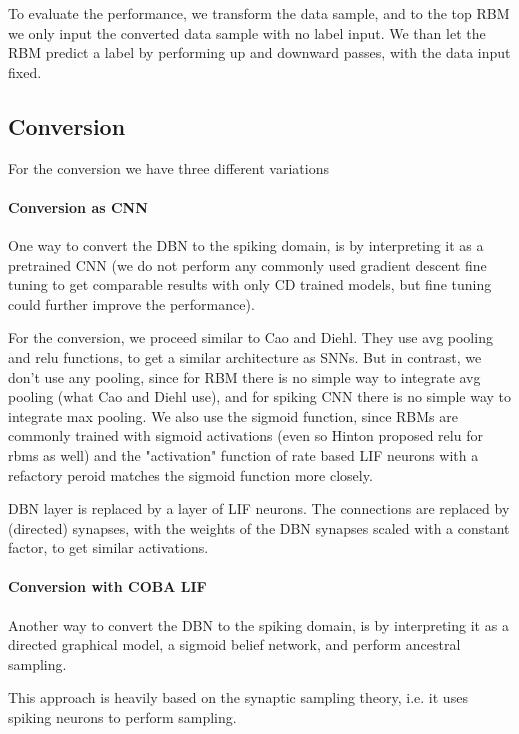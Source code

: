 To evaluate the performance, we transform the data sample, and to the top RBM we only input the converted data sample with no label input.
We than let the RBM predict a label by performing up and downward passes, with the data input fixed.


\subsection{Conversion}

For the conversion we have three different variations

\paragraph{Conversion as CNN} 

One way to convert the DBN to the spiking domain, is by interpreting it as a pretrained CNN (we do not perform any commonly used gradient descent fine tuning to get comparable results with only CD trained models, but fine tuning could further improve the performance).

For the conversion, we proceed similar to Cao and Diehl.
They use avg pooling and relu functions, to get a similar architecture as SNNs.
But in contrast, we don't use any pooling, since for RBM there is no simple way to integrate avg pooling (what Cao and Diehl use), and for spiking CNN there is no simple way to integrate max pooling.
We also use the sigmoid function, since RBMs are commonly trained with sigmoid activations (even so Hinton proposed relu for rbms as well) and the "activation" function of rate based LIF neurons with a refactory peroid matches the sigmoid function more closely.

DBN layer is replaced by a layer of LIF neurons. 
The connections are replaced by (directed) synapses, with the weights of the DBN synapses scaled with a constant factor, to get similar activations.
 

\paragraph{Conversion with COBA LIF}

Another way to convert the DBN to the spiking domain, is by interpreting it as a directed graphical model, a sigmoid belief network, and perform ancestral sampling.

This approach is heavily based on the synaptic sampling theory, i.e. it uses spiking neurons to perform sampling.

